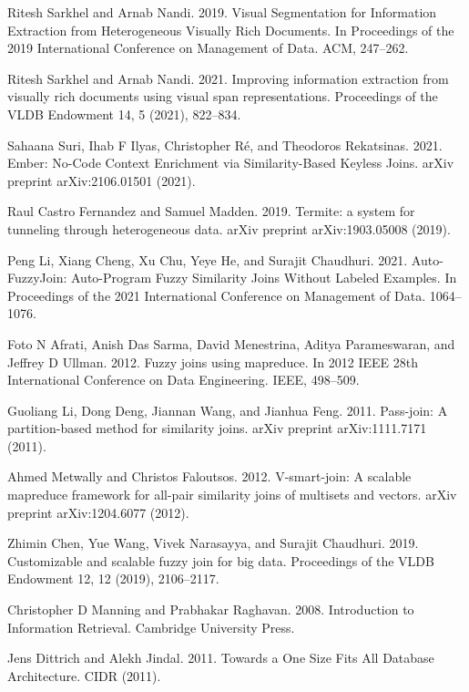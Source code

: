 \documentclass[11pt]{article}
\begin{document}
\begin{thebibliography}{10}
\begin{small}
 Ritesh Sarkhel and Arnab Nandi. 2019. Visual Segmentation for Information Extraction from Heterogeneous Visually Rich Documents. In Proceedings of the 2019 International Conference on Management of Data. ACM, 247–262.

 Ritesh Sarkhel and Arnab Nandi. 2021. Improving information extraction from visually rich documents using visual span representations. Proceedings of the VLDB Endowment 14, 5 (2021), 822–834.

 Sahaana Suri, Ihab F Ilyas, Christopher Ré, and Theodoros Rekatsinas. 2021. Ember: No-Code Context Enrichment via Similarity-Based Keyless Joins. arXiv preprint arXiv:2106.01501 (2021).

 Raul Castro Fernandez and Samuel Madden. 2019. Termite: a system for tunneling through heterogeneous data. arXiv preprint arXiv:1903.05008 (2019).

 Peng Li, Xiang Cheng, Xu Chu, Yeye He, and Surajit Chaudhuri. 2021. Auto-FuzzyJoin: Auto-Program Fuzzy Similarity Joins Without Labeled Examples. In Proceedings of the 2021 International Conference on Management of Data. 1064– 1076.

 Foto N Afrati, Anish Das Sarma, David Menestrina, Aditya Parameswaran, and Jeffrey D Ullman. 2012. Fuzzy joins using mapreduce. In 2012 IEEE 28th International Conference on Data Engineering. IEEE, 498–509.

 Guoliang Li, Dong Deng, Jiannan Wang, and Jianhua Feng. 2011. Pass-join:
A partition-based method for similarity joins. arXiv preprint arXiv:1111.7171
(2011).

 Ahmed Metwally and Christos Faloutsos. 2012. V-smart-join: A scalable mapreduce framework for all-pair similarity joins of multisets and vectors. arXiv preprint arXiv:1204.6077 (2012).

 Zhimin Chen, Yue Wang, Vivek Narasayya, and Surajit Chaudhuri. 2019. Customizable and scalable fuzzy join for big data. Proceedings of the VLDB Endowment 12, 12 (2019), 2106–2117.

 Christopher D Manning and Prabhakar Raghavan. 2008. Introduction to Information Retrieval. Cambridge University Press.

 Jens Dittrich and Alekh Jindal. 2011. Towards a One Size Fits All Database Architecture. CIDR (2011).


\end{small}
\end{thebibliography}
\end{document}
